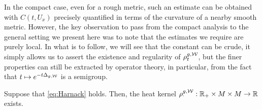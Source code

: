 \documentclass[a4paper, 12pt]{amsart}
\begin{document}
In the compact case, even for a
rough metric, such an estimate can be
obtained with $C(t,U_x)$ precisely quantified
in terms of the curvature of a nearby smooth metric.
However, the key observation to pass from the compact analysis
to the general setting we present here was to note that
the estimates we require are purely local. In 
what is to follow, we will see that the constant can be
crude, it simply allows us to assert the existence and regularity
of $\rho^{g,\mathcal{W}}_t$, but the finer properties can still 
be extracted by operator theory, in particular, from the 
fact that $t \mapsto e^{-t\Delta_{g,\mathcal{W}}}$ is a semigroup.

\begin{prop}
\label{prop:MainRed}
Suppose that \eqref{eq:Harnack} holds. Then, the heat
kernel $\rho^{g,\mathcal{W}}_{\cdotp}: \mathbb{R}_{+} \times M \times M \to \mathbb{R}$
exists.
\end{prop} 
\end{document}
